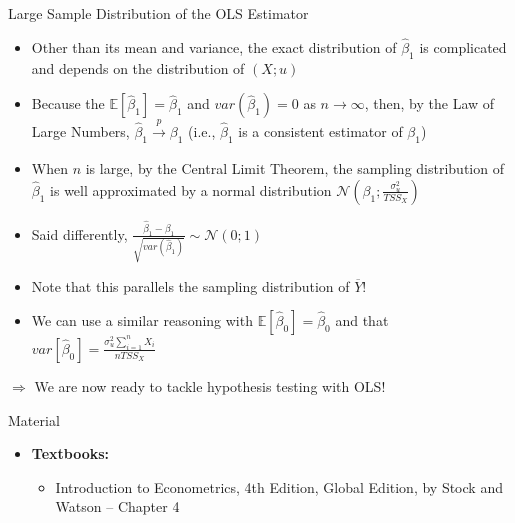 \documentclass[notes,10pt, aspectratio=169]{beamer}
\begin{document}
\begin{frame}{Large Sample Distribution of the OLS Estimator}
\begin{itemize}
    \item Other than its mean and variance, the exact distribution of $\hat{\beta}_1$ is complicated and depends on the distribution of $(X; u)$
    \item Because the $\mathbb{E}[\hat{\beta}_1] = \hat{\beta}_1$ and $var(\hat{\beta}_1)=0$ as $n\rightarrow \infty$, then, by the Law of Large Numbers, $\hat{\beta}_1 \xrightarrow[]{p} \beta_1$ (i.e., $\hat{\beta}_1$ is a consistent estimator of $\beta_1$)
    \item When $n$ is large, by the Central Limit Theorem, the sampling distribution of $\hat{\beta}_1$ is well approximated by a normal distribution $\mathcal{N}(\beta_1; \frac{\sigma^2_u}{TSS_X})$
    \item Said differently, $\frac{\hat{\beta}_1-\beta_1}{\sqrt{var(\hat{\beta}_1)}}\sim \mathcal{N}(0;1)$
    \item Note that this parallels the sampling distribution of $\overline{Y}!$
    \item We can use a similar reasoning with $\mathbb{E}[\hat{\beta}_0] = \hat{\beta}_0$ and that $var[\hat{\beta}_0] = \frac{\sigma^2_u \sum_{i=1}^n X_i}{n TSS_X}$
\end{itemize}\vspace{1cm}
$\Rightarrow$ We are now ready to tackle hypothesis testing with OLS!
\end{frame}



\begin{frame}[allowframebreaks]{Material}
\begin{itemize}
    \item[--] \textbf{Textbooks:}
    \begin{itemize}
        \item Introduction to Econometrics, 4th Edition, Global Edition, by Stock and Watson -- Chapter 4
    \end{itemize}
\end{itemize}
\end{frame}
\end{document}
